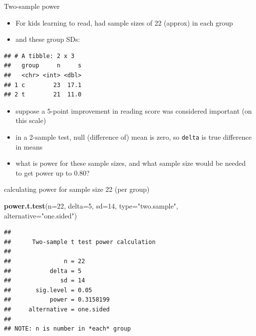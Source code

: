 \documentclass[ignorenonframetext,]{beamer}
\newenvironment{Shaded}{\begin{snugshade}}{\end{snugshade}}
\newcommand{\DataTypeTok}[1]{\textcolor[rgb]{0.13,0.29,0.53}{#1}}
\newcommand{\DecValTok}[1]{\textcolor[rgb]{0.00,0.00,0.81}{#1}}
\newcommand{\KeywordTok}[1]{\textcolor[rgb]{0.13,0.29,0.53}{\textbf{#1}}}
\newcommand{\NormalTok}[1]{#1}
\newcommand{\OperatorTok}[1]{\textcolor[rgb]{0.81,0.36,0.00}{\textbf{#1}}}
\newcommand{\StringTok}[1]{\textcolor[rgb]{0.31,0.60,0.02}{#1}}
\providecommand{\tightlist}{%
  \setlength{\itemsep}{0pt}\setlength{\parskip}{0pt}}
\begin{document}
\begin{frame}[fragile]{Two-sample power}
\protect\hypertarget{two-sample-power}{}

\begin{itemize}
\tightlist
\item
  For kids learning to read, had sample sizes of 22 (approx) in each
  group
\item
  and these group SDs:
\end{itemize}

\begin{Shaded}
\end{Shaded}

\begin{verbatim}
## # A tibble: 2 x 3
##   group     n     s
##   <chr> <int> <dbl>
## 1 c        23  17.1
## 2 t        21  11.0
\end{verbatim}

\begin{itemize}
\tightlist
\item
  suppose a 5-point improvement in reading score was considered
  important (on this scale)
\item
  in a 2-sample test, null (difference of) mean is zero, so
  \texttt{delta} is true difference in means
\item
  what is power for these sample sizes, and what sample size would be
  needed to get power up to 0.80?
\end{itemize}

\end{frame}

\begin{frame}[fragile]{calculating power for sample size 22 (per group)}
\protect\hypertarget{calculating-power-for-sample-size-22-per-group}{}

\begin{Shaded}
\begin{Highlighting}[]
\KeywordTok{power.t.test}\NormalTok{(}\DataTypeTok{n=}\DecValTok{22}\NormalTok{, }\DataTypeTok{delta=}\DecValTok{5}\NormalTok{, }\DataTypeTok{sd=}\DecValTok{14}\NormalTok{, }\DataTypeTok{type=}\StringTok{"two.sample"}\NormalTok{, }
             \DataTypeTok{alternative=}\StringTok{"one.sided"}\NormalTok{)}
\end{Highlighting}
\end{Shaded}

\begin{verbatim}
## 
##      Two-sample t test power calculation 
## 
##               n = 22
##           delta = 5
##              sd = 14
##       sig.level = 0.05
##           power = 0.3158199
##     alternative = one.sided
## 
## NOTE: n is number in *each* group
\end{verbatim}

\end{frame}
\end{document}
